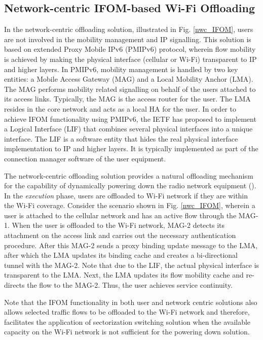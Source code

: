 \documentclass[journal]{IEEEtran}
\begin{document}
\subsection{Network-centric IFOM-based Wi-Fi Offloading}
In the network-centric offloading solution, illustrated in Fig. \ref{nwc_IFOM}, users are not involved in the mobility management and IP signalling. This solution is based on extended Proxy Mobile IPv6 (PMIPv6) \cite{rfc5213} protocol, wherein flow mobility is achieved by making the physical interface (cellular or Wi-Fi) transparent to IP and higher layers. In PMIPv6, mobility management is handled by two key entities: a Mobile Access Gateway (MAG) and a Local Mobility Anchor (LMA). The MAG performs mobility related signalling on behalf of the users attached to its access links. Typically, the MAG is the access router for the user. The LMA resides in the core network and acts as a local HA for the user. In order to achieve IFOM functionality using PMIPv6, the IETF has proposed to implement a Logical Interface (LIF) that combines several physical interfaces into a unique interface. The LIF is a software entity that hides the real physical interface implementation to IP and higher layers. It is typically implemented as part of the connection manager software of the user equipment. 



The network-centric offloading solution provides a natural offloading mechanism for the capability of dynamically powering down the radio network equipment (). In the \emph{execution} phase, users are offloaded to Wi-Fi network if they are within the Wi-Fi coverage. Consider the scenario shown in Fig. \ref{nwc_IFOM}, wherein a user is attached to the cellular network and has an active flow through the MAG-1. When the user is offloaded to the Wi-Fi network, MAG-2 detects its attachment on the access link and carries out the necessary authentication procedure. After this MAG-2 sends a proxy binding update message to the LMA, after which the LMA updates its binding cache and creates a bi-directional tunnel with the MAG-2. Note that due to the LIF, the actual physical interface is transparent to the LMA. Next, the LMA updates its flow mobility cache and re-directs the flow to the MAG-2. Thus, the user achieves service continuity. 



Note that the IFOM functionality in both user and network centric solutions also allows selected traffic flows to be offloaded to the Wi-Fi network and therefore, facilitates the application of sectorization switching solution when the available capacity on the Wi-Fi network is not sufficient for the powering down solution. 
\end{document}
